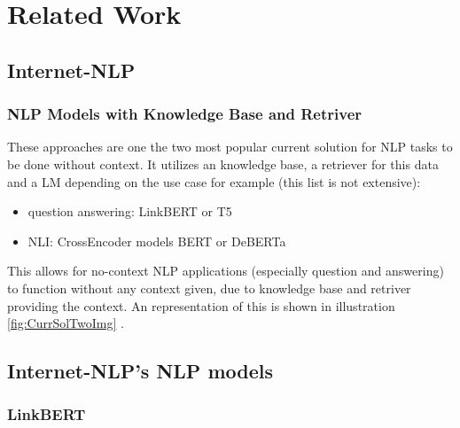 \section{Related Work}

\subsection{Internet-NLP}

\subsubsection{NLP Models with Knowledge Base and Retriver}

These approaches are one the two most popular current solution for NLP tasks to be done without context. It utilizes an knowledge base, a retriever for this data and a LM depending on the use case for example (this list is not extensive):

\begin{itemize}[leftmargin=1em]
    \item question answering: LinkBERT or T5 \cite{https://doi.org/10.48550/arxiv.2203.15827, https://doi.org/10.48550/arxiv.1910.10683}
    \item NLI: CrossEncoder models BERT or DeBERTa \cite{thakur-2020-AugSBERT, https://doi.org/10.48550/arxiv.1810.04805, https://doi.org/10.48550/arxiv.2006.03654}
\end{itemize}

This allows for no-context NLP applications (especially question and answering) to function without any context given, due to knowledge base and retriver providing the context. An representation of this is shown in illustration \ref{fig:CurrSolTwoImg} \cite{https://doi.org/10.48550/arxiv.2201.09651}.

\subsection{Internet-NLP's NLP models}

\subsubsection{LinkBERT}

